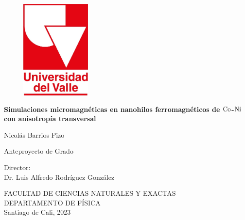 \begin{titlepage}
\thispagestyle{empty}

\begin{center}
\begin{figure}[!htp]
    \centering
    \includegraphics[height=5cm]{Main/logoUV_Oficial_Rojo.jpg}
\end{figure}

\vspace*{0.2in}

\begin{Large}
\textbf{Simulaciones micromagnéticas en nanohilos ferromagnéticos de $\ce{Co}$-$\ce{Ni}$ con anisotropía transversal}\\
\end{Large}


\vspace*{0.8in}
\begin{large}
Nicolás Barrios Pizo \\
\end{large}
\vspace*{0.8in}
\begin{large}
Anteproyecto de Grado\\
\end{large}
\vspace*{1 in}
\vspace*{0 in}
\begin{large}
Director:\\
Dr. Luis Alfredo Rodríguez González
\end{large}

\vspace*{1.5 in}
FACULTAD DE CIENCIAS NATURALES Y EXACTAS\\
\vspace*{0.1in}
DEPARTAMENTO DE FÍSICA \\
\vspace*{0.1in}
Santiago de Cali, 2023

\end{center}

\end{titlepage}